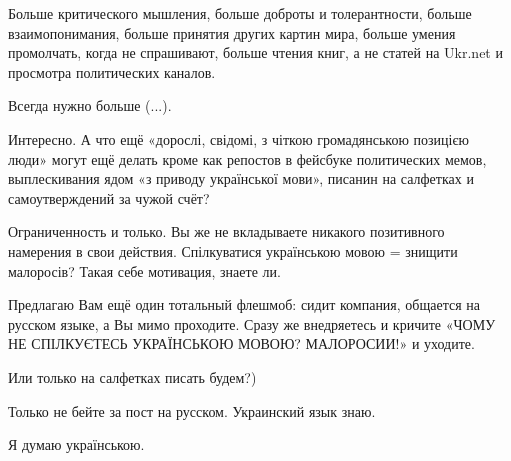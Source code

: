 Больше критического мышления, больше доброты и толерантности, больше
взаимопонимания, больше принятия других картин мира, больше умения промолчать,
когда не спрашивают, больше чтения книг, а не статей на Ukr.net и просмотра
политических каналов. 

Всегда нужно больше (...). 

Интересно. А что ещё «дорослі, свідомі, з чіткою громадянською позицією люди»
могут ещё делать кроме как репостов в фейсбуке политических мемов,
выплескивания ядом «з приводу української мови», писанин на салфетках и
самоутверждений за чужой счёт? 

Ограниченность и только. Вы же не вкладываете никакого позитивного намерения в
свои действия. Спілкуватися українською мовою = знищити малоросів? Такая себе
мотивация, знаете ли. 

Предлагаю Вам ещё один тотальный флешмоб: сидит компания, общается на русском
языке, а Вы мимо проходите. Сразу же внедряетесь и кричите «ЧОМУ НЕ СПІЛКУЄТЕСЬ
УКРАЇНСЬКОЮ МОВОЮ? МАЛОРОСИИ!» и уходите. 

Или только на салфетках писать будем?)

Только не бейте за пост на русском. Украинский язык знаю. 

Я думаю українською.
